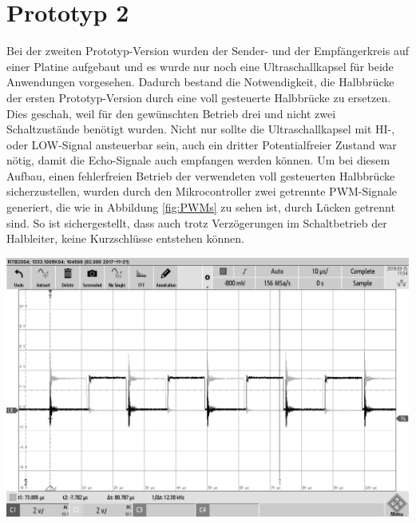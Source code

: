 \section{Prototyp 2}
Bei der zweiten Prototyp-Version wurden der Sender- und der Empfängerkreis auf einer Platine aufgebaut und es wurde nur noch eine Ultraschallkapsel für beide Anwendungen vorgesehen. Dadurch bestand die Notwendigkeit, die Halbbrücke der ersten Prototyp-Version durch eine voll gesteuerte Halbbrücke zu ersetzen. Dies geschah, weil für den gewünschten Betrieb drei und nicht zwei Schaltzustände benötigt wurden. Nicht nur sollte die Ultraschallkapsel mit HI-, oder LOW-Signal ansteuerbar sein, auch ein dritter Potentialfreier Zustand war nötig, damit die Echo-Signale auch empfangen werden können. Um bei diesem Aufbau, einen fehlerfreien Betrieb der verwendeten voll gesteuerten Halbbrücke sicherzustellen, wurden durch den Mikrocontroller zwei getrennte PWM-Signale generiert, die wie in Abbildung \ref{fig:PWMs} zu sehen ist, durch Lücken getrennt sind. So ist sichergestellt, dass auch trotz Verzögerungen im Schaltbetrieb der Halbleiter, keine Kurzschlüsse entstehen können.\\
\begin{minipage}{0.75\textwidth}
\includegraphics[width=1\textwidth%
]{Abbildungen/MessungenP2/Zwei_PWMs_von_der_CPU.PNG}
\label{fig:PWMs}
\end{minipage}\\
